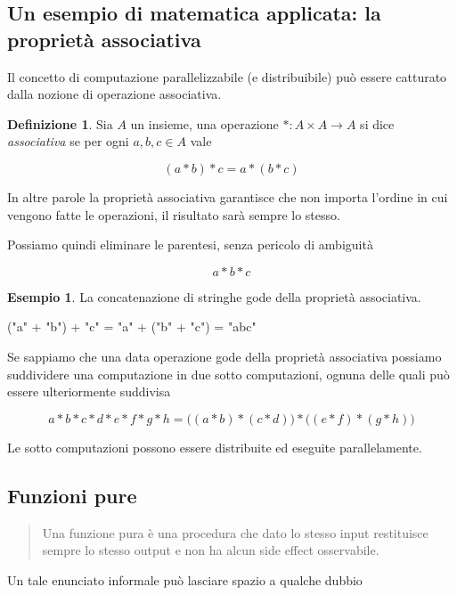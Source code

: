 \documentclass[12pt]{article}
\theoremstyle{definition}
\newtheorem{definition}{Definizione}[section]
\newtheorem{example}{Esempio}[section]
\newenvironment{code}
  {\vspace{0.5cm} \VerbatimEnvironment\begin{typescriptcode}}
  {\end{typescriptcode} \vspace{0.2cm}}
\begin{document}
\subsection{Un esempio di matematica applicata: la proprietà associativa}

Il concetto di computazione parallelizzabile (e distribuibile) può essere catturato dalla nozione di operazione associativa.

\begin{definition}
Sia $A$ un insieme, una operazione $*: A \times A \rightarrow A$ si dice \emph{associativa} se per ogni $a, b, c \in A$ vale

$$
(a * b) * c = a * ( b * c )
$$
\end{definition}

In altre parole la proprietà associativa garantisce che non importa l'ordine in cui vengono fatte le operazioni, il risultato sarà sempre lo stesso.

Possiamo quindi eliminare le parentesi, senza pericolo di ambiguità

$$
a * b * c
$$

\begin{example}
La concatenazione di stringhe gode della proprietà associativa.

\begin{code}
("a" + "b") + "c" = "a" + ("b" + "c") = "abc"
\end{code}
\end{example}

Se sappiamo che una data operazione gode della proprietà associativa possiamo suddividere una computazione in due sotto computazioni, ognuna delle quali può essere ulteriormente suddivisa

$$
a * b * c * d * e * f * g * h = \Big( ( a * b ) * ( c * d ) \Big) * \Big( ( e * f ) * ( g * h ) \Big)
$$

Le sotto computazioni possono essere distribuite ed eseguite parallelamente.

\subsection{Funzioni pure}

\begin{quote}
Una funzione pura è una procedura che dato lo stesso input restituisce sempre lo stesso output e non ha alcun side effect osservabile.
\end{quote}

Un tale enunciato informale può lasciare spazio a qualche dubbio
\end{document}
